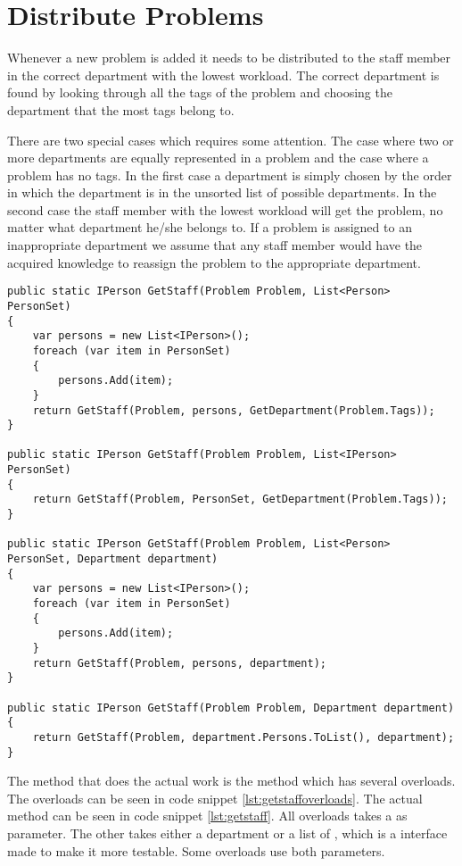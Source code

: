 \section{Distribute Problems}
\label{sec:dispro}
Whenever a new problem is added it needs to be distributed to the staff member in the correct department with the lowest workload. 
The correct department is found by looking through all the tags of the problem and choosing the department that the most tags belong to.

There are two special cases which requires some attention. 
The case where two or more departments are equally represented in a problem and the case where a problem has no tags. 
In the first case a department is simply chosen by the order in which the department is in the unsorted list of possible departments. 
In the second case the staff member with the lowest workload will get the problem, no matter what department he/she belongs to.
If a problem is assigned to an inappropriate department we assume that any staff member would have the acquired knowledge to reassign the problem to the appropriate department. 


\begin{lstlisting}[style=sourceCode, caption=\myCaption{The overloads for the \me{GetStaff} method}, label=lst:getstaffoverloads,float=h]
public static IPerson GetStaff(Problem Problem, List<Person> PersonSet)
{
    var persons = new List<IPerson>();
    foreach (var item in PersonSet)
    {
        persons.Add(item);
    }
    return GetStaff(Problem, persons, GetDepartment(Problem.Tags));
}

public static IPerson GetStaff(Problem Problem, List<IPerson> PersonSet)
{
    return GetStaff(Problem, PersonSet, GetDepartment(Problem.Tags));
}

public static IPerson GetStaff(Problem Problem, List<Person> PersonSet, Department department)
{
    var persons = new List<IPerson>();
    foreach (var item in PersonSet)
    {
        persons.Add(item);
    }
    return GetStaff(Problem, persons, department);
}

public static IPerson GetStaff(Problem Problem, Department department)
{
    return GetStaff(Problem, department.Persons.ToList(), department);
}
\end{lstlisting}
The method that does the actual work is the  method which has several overloads. The overloads can be seen in code snippet \ref{lst:getstaffoverloads}. The actual method can be seen in code snippet \ref{lst:getstaff}. 
All overloads takes a  as parameter. 
The other takes either a department or a list of , which is a  interface made to make it more testable. 
Some overloads use both parameters.

